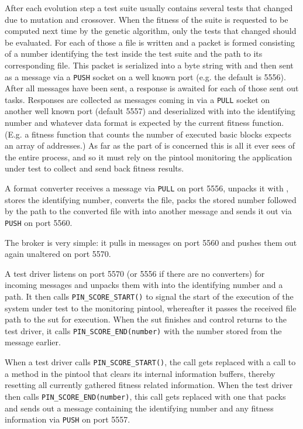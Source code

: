 After each evolution step a test suite usually contains several tests that changed due to mutation and
crossover. When the fitness of the suite is requested to be computed next time by the genetic algorithm, 
only the tests that changed should be evaluated. For each of those a file is written and a packet is 
formed consisting of a number identifying the test inside the test suite and the path to its corresponding 
file. This packet is serialized into a byte string with \msgpack and then sent as a \zmq message via a 
\texttt{PUSH} socket on a well known port (e.g. the default is 5556). After all messages have been sent,
a response is awaited for each of those sent out tasks. Responses are collected as \zmq messages coming 
in via a \texttt{PULL} socket on another well known port (default 5557) and deserialized with \msgpack 
into the identifying number and whatever data format is expected by the current fitness function. 
(E.g. a fitness function that counts the number of executed basic blocks expects an array of addresses.)
As far as the \java part of \xmlmate is concerned this is all it ever sees of the entire process, and so it 
must rely on the pintool monitoring the application under test to collect and send back fitness results.


A format converter receives a \zmq message via \texttt{PULL} on port 5556, unpacks it with \msgpack, 
stores the identifying number, converts the file, packs the stored number followed by the path to 
the converted file with \msgpack into another \zmq message and sends it out via \texttt{PUSH} on port 5560.


The broker is very simple: it pulls in messages on port 5560 and pushes them out again unaltered on port 5570.


A test driver listens on port 5570 (or 5556 if there are no converters) for incoming \zmq messages and unpacks
them with \msgpack into the identifying number and a path. It then calls \texttt{PIN\_SCORE\_START()} to 
signal the start of the execution of the system under test to the monitoring pintool, whereafter it passes the 
received file path to the sut for execution. When the sut finishes and control returns to the test driver, 
it calls \texttt{PIN\_SCORE\_END(number)} with the number stored from the message earlier.


When a test driver calls \texttt{PIN\_SCORE\_START()}, the call gets replaced with a call to a method in the 
pintool that clears its internal information buffers, thereby resetting all currently gathered fitness related 
information. When the test driver then calls \texttt{PIN\_SCORE\_END(number)}, this call gets replaced with 
one that packs and sends out a message containing the identifying number and any fitness information via \zmq 
\texttt{PUSH} on port 5557.

